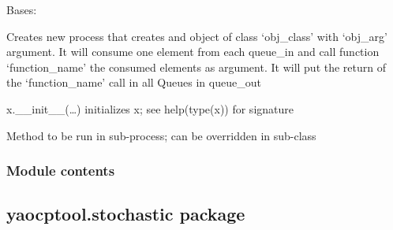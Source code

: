 \documentclass[letterpaper,10pt,english]{sphinxmanual}
\begin{document}
\begin{fulllineitems}
\label{\detokenize{yaocptool.parallel:yaocptool.parallel.worker.Worker}}
Bases: 

Creates new process that creates and object of class ‘obj\_class’ with ‘obj\_arg’ argument.
It will consume one element from each queue\_in and call function ‘function\_name’ the consumed elements as argument.
It will put the return of the ‘function\_name’ call in all Queues in queue\_out

\begin{fulllineitems}
\label{\detokenize{yaocptool.parallel:yaocptool.parallel.worker.Worker.__init__}}
x.\_\_init\_\_(…) initializes x; see help(type(x)) for signature

\end{fulllineitems}


\begin{fulllineitems}
\label{\detokenize{yaocptool.parallel:yaocptool.parallel.worker.Worker.run}}
Method to be run in sub-process; can be overridden in sub-class

\end{fulllineitems}


\end{fulllineitems}



\subsubsection{Module contents}
\label{\detokenize{yaocptool.parallel:module-yaocptool.parallel}}\label{\detokenize{yaocptool.parallel:module-contents}}

\subsection{yaocptool.stochastic package}
\label{\detokenize{yaocptool.stochastic:yaocptool-stochastic-package}}\label{\detokenize{yaocptool.stochastic::doc}}
\end{document}

